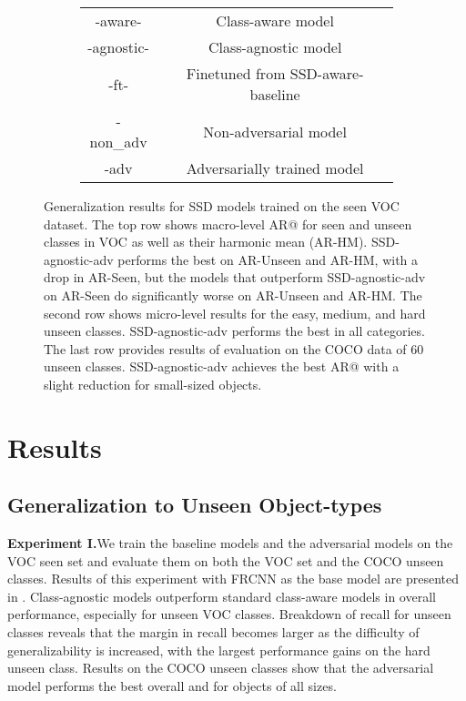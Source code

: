 \documentclass[10pt,twocolumn,letterpaper]{article}
\begin{document}
{\begin{figure*}
\begin{subfigure}{\fs\textwidth}
\begin{tabular}{c c}
    -aware- & Class-aware model \\
    -agnostic- & Class-agnostic model \\
    -ft- & Finetuned from SSD-aware-baseline \\
    -non\_adv & Non-adversarial model \\
    -adv & Adversarially trained model \\
\bottomrule
\end{tabular}
\end{subfigure}
\caption{Generalization results for SSD models trained on the seen VOC dataset. The top row shows macro-level AR@ for seen and unseen classes in VOC as well as their harmonic mean (AR-HM). SSD-agnostic-adv performs the best on AR-Unseen and AR-HM, with a drop in AR-Seen, but the models that outperform SSD-agnostic-adv on AR-Seen do significantly worse on AR-Unseen and AR-HM. The second row shows micro-level results for the easy, medium, and hard unseen classes. SSD-agnostic-adv performs the best in all categories. The last row provides results of evaluation on the COCO data of 60 unseen classes. SSD-agnostic-adv achieves the best AR@ with a slight reduction for small-sized objects.}
\label{fig:ssd_voc}
\vspace{-5pt}
\end{figure*}
}

\section{Results}
\label{sec:evaluation}

\subsection{Generalization to Unseen Object-types}
\label{subsec:results_gen}

\noindent\textbf{Experiment I.}\quad We train the baseline models and the adversarial models on the VOC seen set and evaluate them on both the VOC set and the COCO unseen classes. Results of this experiment with FRCNN as the base model are presented in . Class-agnostic models outperform standard class-aware models in overall performance, especially for unseen VOC classes. Breakdown of recall for unseen classes reveals that the margin in recall becomes larger as the difficulty of generalizability is increased, with the largest performance gains on the hard unseen class. Results on the COCO unseen classes show that the adversarial model performs the best overall and for objects of all sizes.
\end{document}
